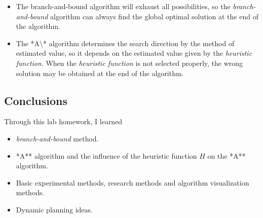 \documentclass[
]{article}
\begin{document}
\begin{enumerate}
  \begin{itemize}
  \item
    The branch-and-bound algorithm will exhaust all possibilities, so
    the \emph{branch-and-bound} algorithm can always find the global
    optimal solution at the end of the algorithm.
  \item
    The *A\textbackslash** algorithm determines the search direction by
    the method of estimated value, so it depends on the estimated value
    given by the \emph{heuristic function}. When the \emph{heuristic
    function} is not selected properly, the wrong solution may be
    obtained at the end of the algorithm.
  \end{itemize}
\end{enumerate}

\hypertarget{header-n168}{%
\subsection{Conclusions}\label{header-n168}}

Through this lab homework, I learned

\begin{itemize}
\item
  \emph{branch-and-bound} method.
\item
  *A** algorithm and the influence of the heuristic function \(H\) on
  the *A** algorithm.
\item
  Basic experimental methods, research methods and algorithm
  visualization methods.
\item
  Dynamic planning ideas.
\end{itemize}
\end{document}
